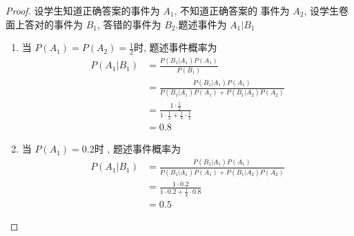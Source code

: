 \documentclass[../main.tex]{subfiles}
\begin{document}
\begin{proof}
   设学生知道正确答案的事件为 \(  A_1  \), 不知道正确答案的 事件为 \(  A_2  \), 设学生卷面上答对的事件为 \(  B_1  \), 答错的事件为 \(  B_2  \).题述事件为 \(  A_1|B_1  \)  
   \begin{enumerate}
    \item 当 \(  P\left( A_1 \right)= P\left( A_2 \right)= \frac{1 }{2 }     \)时, 题述事件概率为 \[
    \begin{aligned}
    P\left( A_1|B_1 \right)&= \frac{P\left( B_1|A_1 \right)P\left( A_1 \right)   }{P\left( B_1 \right)  }   \\ 
     &= \frac{P\left( B_1|A_1 \right)P\left( A_1 \right)   }{P\left( B_1|A_1 \right)P\left( A_1 \right)+ P\left( B_1|A_2 \right)P\left( A_2 \right)     } \\ 
      &= \frac{1\cdot \frac{1 }{2 }  }{1\cdot \frac{1 }{2 }+ \frac{1 }{4 }\cdot \frac{1 }{2 }    }\\ 
       &= 0.8 
    \end{aligned}
    \]
    \item 当 \(  P\left( A_1 \right)= 0.2   \)时 , 题述事件概率为 \[
  \begin{aligned}
    P\left( A_1|B_1 \right)&= \frac{P\left( B_1|A_1 \right)P\left( A_1 \right)   }{P\left( B_1|A_1 \right)P\left( A_1 \right)+ P\left( B_1|A_2 \right)P\left( A_2 \right)     } \\ 
      &= \frac{1\cdot 0.2 }{1\cdot 0.2+ \frac{1 }{4 }\cdot 0.8  }\\ 
       &= 0.5  
  \end{aligned}
    \] 
   \end{enumerate}
      
\end{proof}
\end{document}
